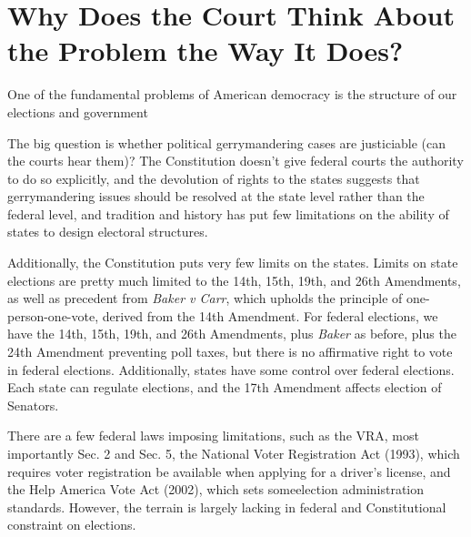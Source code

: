 




\section*{Why Does the Court Think About the Problem the Way It Does?}

One of the fundamental problems of American democracy is the structure of our elections and government

The big question is whether political gerrymandering cases are justiciable (can the courts hear them)? The Constitution doesn't give federal courts the authority to do so explicitly, and the devolution of rights to the states suggests that gerrymandering issues should be resolved at the state level rather than the federal level, and tradition and history has put few limitations on the ability of states to design electoral structures.

Additionally, the Constitution puts very few limits on the states.  Limits on state elections are pretty much limited to the 14th, 15th, 19th, and 26th Amendments, as well as precedent from \textit{Baker v Carr}, which upholds the principle of one-person-one-vote, derived from the 14th Amendment.  For federal elections, we have the 14th, 15th, 19th, and 26th Amendments, plus \textit{Baker} as before, plus the 24th Amendment preventing poll taxes, but there is no affirmative right to vote in federal elections.  Additionally, states have some control over federal elections.  Each state can regulate elections, and the 17th Amendment affects election of Senators.

There are a few federal laws imposing limitations, such as the VRA, most importantly Sec. 2 and Sec. 5, the National Voter Registration Act (1993), which requires voter registration be available when applying for a driver's license, and the Help America Vote Act (2002), which sets someelection administration standards.  However, the terrain is largely lacking in federal and Constitutional constraint on elections.  

